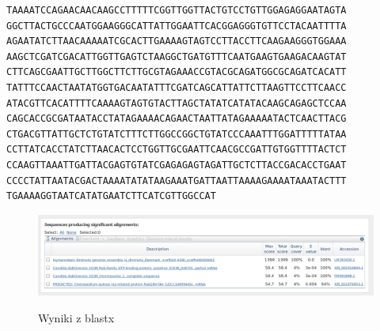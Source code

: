 \documentclass[a4paper]{article}
\begin{document}
\begin{verbatim}
TAAAATCCAGAACAACAAGCCTTTTTCGGTTGGTTACTGTCCTGTTGGAGAGGAATAGTA
GGCTTACTGCCCAATGGAAGGGCATTATTGGAATTCACGGAGGGTGTTCCTACAATTTTA
AGAATATCTTAACAAAAATCGCACTTGAAAAGTAGTCCTTACCTTCAAGAAGGGTGGAAA
AAGCTCGATCGACATTGGTTGAGTCTAAGGCTGATGTTTCAATGAAGTGAAGACAAGTAT
CTTCAGCGAATTGCTTGGCTTCTTGCGTAGAAACCGTACGCAGATGGCGCAGATCACATT
TATTTCCAACTAATATGGTGACAATATTTCGATCAGCATTATTCTTAAGTTCCTTCAACC
ATACGTTCACATTTTCAAAAGTAGTGTACTTAGCTATATCATATACAAGCAGAGCTCCAA
CAGCACCGCGATAATACCTATAGAAAACAGAACTAATTATAGAAAAATACTCAACTTACG
CTGACGTTATTGCTCTGTATCTTTCTTGGCCGGCTGTATCCCAAATTTGGATTTTTATAA
CCTTATCACCTATCTTAACACTCCTGGTTGCGAATTCAACGCCGATTGTGGTTTTACTCT
CCAAGTTAAATTGATTACGAGTGTATCGAGAGAGTAGATTGCTCTTACCGACACCTGAAT
CCCCTATTAATACGACTAAAATATATAAGAAATGATTAATTAAAAGAAAATAAATACTTT
TGAAAAGGTAATCATATGAATCTTCATCGTTGGCCAT
\end{verbatim}

\begin{figure}[h]
    \centering
    \includegraphics[width=1.0\textwidth]{result.png}
    \label{fig:single}
    \caption[]{Wyniki z blastx}
\end{figure}
\end{document}
